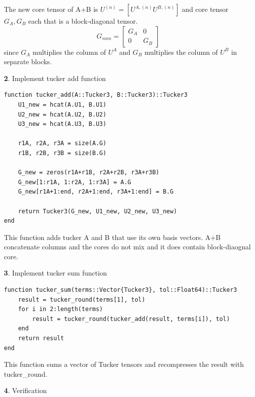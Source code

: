 \documentclass[11pt]{article}
\begin{document}
The new core tensor of A+B is $U^{(n)} = [U^{A,(n)} U^{B, (n)}]$ and core tensor $G_A , G_B$ each that is a block-diagonal tensor.
\[
G_{sum}=\begin{bmatrix}
G_A&0\\0&G_B
\end{bmatrix}
\]
since $G_A$ multiplies the column of $U^A$ and $G_B$ multiplies the column of $U^B$ in separate blocks.

\vspace{1.5em}

\textbf{2}. Implement tucker add function

\begin{lstlisting}
function tucker_add(A::Tucker3, B::Tucker3)::Tucker3
    U1_new = hcat(A.U1, B.U1)   
    U2_new = hcat(A.U2, B.U2)
    U3_new = hcat(A.U3, B.U3)  

    r1A, r2A, r3A = size(A.G)
    r1B, r2B, r3B = size(B.G)

    G_new = zeros(r1A+r1B, r2A+r2B, r3A+r3B)
    G_new[1:r1A, 1:r2A, 1:r3A] = A.G
    G_new[r1A+1:end, r2A+1:end, r3A+1:end] = B.G

    return Tucker3(G_new, U1_new, U2_new, U3_new)
end
\end{lstlisting}

This function adds tucker A and B that use its own basis vectors. A+B concatenate columns and the cores do not mix and it does contain block-diaognal core.

\vspace{1.5em}

\textbf{3}. Implement tucker sum function

\begin{lstlisting}
function tucker_sum(terms::Vector{Tucker3}, tol::Float64)::Tucker3
    result = tucker_round(terms[1], tol)
    for i in 2:length(terms)
        result = tucker_round(tucker_add(result, terms[i]), tol)
    end
    return result
end
\end{lstlisting}

This function sums a
vector of Tucker tensors and recompresses the result with tucker\_round.

\vspace{1.5em}

\textbf{4}. Verification
\end{document}
